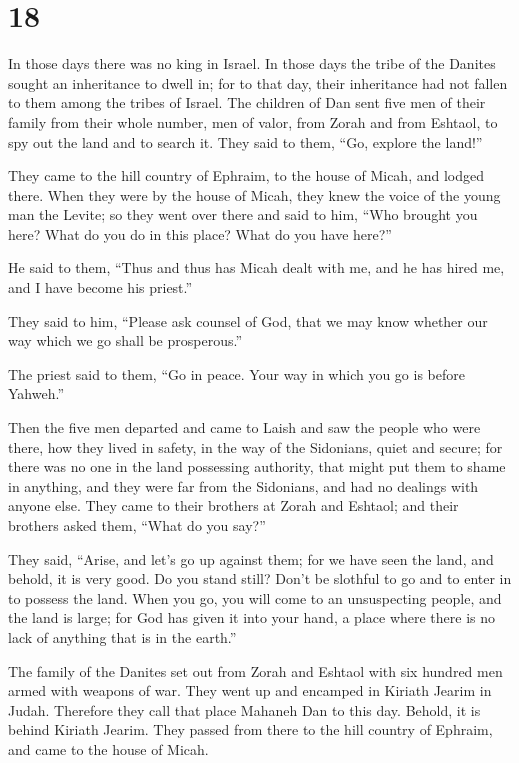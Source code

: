 \hypertarget{section-17}{%
\section{18}\label{section-17}}

 In those days there was no king in Israel. In those days
the tribe of the Danites sought an inheritance to dwell in; for to that
day, their inheritance had not fallen to them among the tribes of
Israel.  The children of Dan sent five men of their family
from their whole number, men of valor, from Zorah and from Eshtaol, to
spy out the land and to search it. They said to them, ``Go, explore the
land!''

They came to the hill country of Ephraim, to the house of Micah, and
lodged there.  When they were by the house of Micah, they
knew the voice of the young man the Levite; so they went over there and
said to him, ``Who brought you here? What do you do in this place? What
do you have here?''

 He said to them, ``Thus and thus has Micah dealt with me,
and he has hired me, and I have become his priest.''

 They said to him, ``Please ask counsel of God, that we may
know whether our way which we go shall be prosperous.''

 The priest said to them, ``Go in peace. Your way in which
you go is before Yahweh.''

 Then the five men departed and came to Laish and saw the
people who were there, how they lived in safety, in the way of the
Sidonians, quiet and secure; for there was no one in the land possessing
authority, that might put them to shame in anything, and they were far
from the Sidonians, and had no dealings with anyone else. 
They came to their brothers at Zorah and Eshtaol; and their brothers
asked them, ``What do you say?''

 They said, ``Arise, and let's go up against them; for we
have seen the land, and behold, it is very good. Do you stand still?
Don't be slothful to go and to enter in to possess the land.
 When you go, you will come to an unsuspecting people, and
the land is large; for God has given it into your hand, a place where
there is no lack of anything that is in the earth.''

 The family of the Danites set out from Zorah and Eshtaol
with six hundred men armed with weapons of war.  They went
up and encamped in Kiriath Jearim in Judah. Therefore they call that
place Mahaneh Dan to this day. Behold, it is behind Kiriath Jearim.
 They passed from there to the hill country of Ephraim, and
came to the house of Micah.

